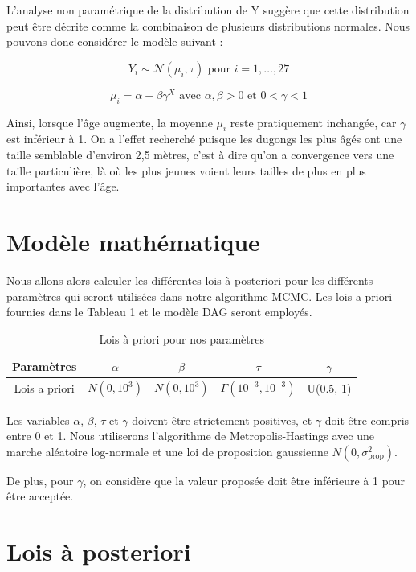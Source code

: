 \documentclass{rapportECN}
\begin{document}
L'analyse non paramétrique de la distribution de Y suggère que cette distribution peut être décrite comme la combinaison de plusieurs distributions normales. Nous pouvons donc considérer le modèle suivant :

\[ Y_i \sim \mathcal{N}(\mu_i, \tau) \text{ pour } i = 1, \dots, 27 \]

\[ \mu_i = \alpha - \beta \gamma^X \text{ avec } \alpha, \beta > 0 \text{ et } 0 < \gamma < 1 \]

Ainsi, lorsque l'âge augmente, la moyenne $\mu_i$ reste pratiquement inchangée, car $\gamma$ est inférieur à 1. On a l'effet recherché puisque les dugongs les  plus âgés ont une taille semblable d'environ 2,5 mètres, c'est à dire qu'on a convergence vers une taille particulière, là où les plus jeunes voient leurs tailles de plus en plus importantes avec l'âge.

\section*{Modèle mathématique}

Nous allons alors calculer les différentes lois à posteriori pour les différents paramètres qui seront utilisées dans notre algorithme MCMC. Les lois a priori fournies dans le Tableau 1 et le modèle DAG seront employés.

\begin{table}[H]
\centering
\begin{tabular}{|c|c|c|c|c|}
\hline
Paramètres & $\alpha$ & $\beta$ & $\tau$ & $\gamma$ \\
\hline
Lois a priori & $N(0, 10^3)$ & $N(0, 10^3)$ & $\Gamma(10^{-3}, 10^{-3})$ & U(0.5, 1) \\
\hline
\end{tabular}
\caption{Lois à priori pour nos paramètres}
\end{table}

Les variables $\alpha$, $\beta$, $\tau$ et $\gamma$ doivent être strictement positives, et $\gamma$ doit être compris entre 0 et 1. Nous utiliserons l'algorithme de Metropolis-Hastings avec une marche aléatoire log-normale et une loi de proposition gaussienne $N(0, \sigma_{\text{prop}}^2)$.

De plus, pour $\gamma$, on considère que la valeur proposée doit être inférieure à 1 pour être acceptée.

\section*{Lois à posteriori}
\end{document}
